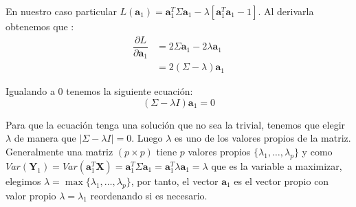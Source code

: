 \noindent En nuestro caso particular $L(\textbf{a}_1)=\textbf{a}_1^T \Sigma \textbf{a}_1 - \lambda[\textbf{a}_1^T \textbf{a}_1-1]$. Al derivarla obtenemos que :
\begin{align*}
\dfrac{\partial L}{\partial \textbf{a}_1} &= 2\Sigma \textbf{a}_1 - 2\lambda\textbf{a}_1\\
& = 2(\Sigma-\lambda)\textbf{a}_1 
\end{align*}

\noindent Igualando a 0 tenemos la siguiente ecuación: 
\begin{equation}
(\Sigma-\lambda I)\textbf{a}_1=0
\end{equation}

\noindent Para que la ecuación tenga una solución que no sea la trivial, tenemos que elegir $\lambda$ de manera que $|\Sigma-\lambda I| = 0$. Luego $\lambda$ es uno de los valores propios de la matriz. Generalmente una matriz $(p\times p)$ tiene $p$ valores propios $\lbrace\lambda_1, \ldots ,\lambda_p \rbrace$ y como $Var(\textbf{Y}_1)=Var(\textbf{a}_1^T\textbf{X})= \textbf{a}_1^T \Sigma \textbf{a}_1 =\textbf{a}_1^T \lambda \textbf{a}_1=\lambda$ que es la variable a maximizar, elegimos $\lambda=\max \lbrace\lambda_1, \ldots ,\lambda_p \rbrace$, por tanto, el vector $\textbf{a}_1$ es el vector propio con valor propio $\lambda=\lambda_1$ reordenando si es necesario. 


